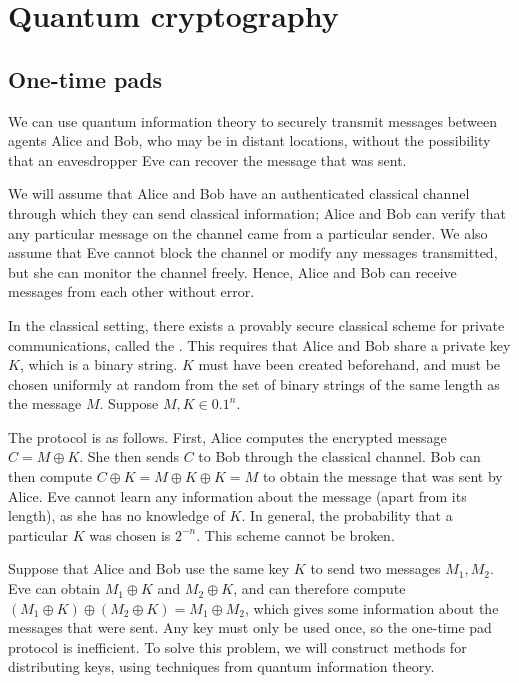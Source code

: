 \section{Quantum cryptography}

\subsection{One-time pads}
We can use quantum information theory to securely transmit messages between agents Alice and Bob, who may be in distant locations, without the possibility that an eavesdropper Eve can recover the message that was sent.

We will assume that Alice and Bob have an authenticated classical channel through which they can send classical information; Alice and Bob can verify that any particular message on the channel came from a particular sender.
We also assume that Eve cannot block the channel or modify any messages transmitted, but she can monitor the channel freely.
Hence, Alice and Bob can receive messages from each other without error.

In the classical setting, there exists a provably secure classical scheme for private communications, called the .
This requires that Alice and Bob share a private key $K$, which is a binary string.
$K$ must have been created beforehand, and must be chosen uniformly at random from the set of binary strings of the same length as the message $M$.
Suppose $M, K \in \qty{0,1}^n$.

The protocol is as follows.
First, Alice computes the encrypted message $C = M \oplus K$.
She then sends $C$ to Bob through the classical channel.
Bob can then compute $C \oplus K = M \oplus K \oplus K = M$ to obtain the message that was sent by Alice.
Eve cannot learn any information about the message (apart from its length), as she has no knowledge of $K$.
In general, the probability that a particular $K$ was chosen is $2^{-n}$.
This scheme cannot be broken.

Suppose that Alice and Bob use the same key $K$ to send two messages $M_1, M_2$.
Eve can obtain $M_1 \oplus K$ and $M_2 \oplus K$, and can therefore compute $(M_1 \oplus K) \oplus (M_2 \oplus K) = M_1 \oplus M_2$, which gives some information about the messages that were sent.
Any key must only be used once, so the one-time pad protocol is inefficient.
To solve this problem, we will construct methods for distributing keys, using techniques from quantum information theory.

